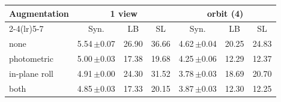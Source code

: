 \begin{tabular}{@{}l ccc ccc@{}}
\toprule
Augmentation & \multicolumn{3}{c}{1 view} & \multicolumn{3}{c}{orbit (4)} \\
\cmidrule(lr){2-4}\cmidrule(lr){5-7} & Syn. & LB & SL & Syn. & LB & SL \\
\midrule
none & 5.54\,{\scriptsize$\pm$0.07} & 26.90 & 36.66 & 4.62\,{\scriptsize$\pm$0.04} & 20.25 & 24.83 \\
photometric & 5.00\,{\scriptsize$\pm$0.03} & 17.38 & 19.68 & 4.25\,{\scriptsize$\pm$0.06} & 12.29 & 12.37 \\
in-plane roll & 4.91\,{\scriptsize$\pm$0.00} & 24.30 & 31.52 & 3.78\,{\scriptsize$\pm$0.03} & 18.69 & 20.70 \\
both & 4.85\,{\scriptsize$\pm$0.03} & 17.33 & 20.15 & 3.87\,{\scriptsize$\pm$0.03} & 12.30 & 12.25 \\
\bottomrule
\end{tabular}